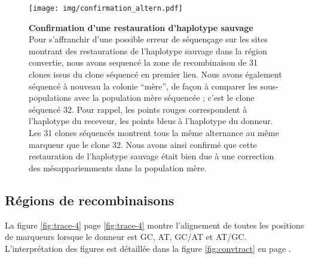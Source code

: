 \begin{figure}[h!]
  \centering
  \texttt{[image: img/confirmation\_altern.pdf]}
  \caption[Confirmation des restaurations]{\label{fig:confirm-haplotype}
    \textbf{Confirmation d'une restauration d'haplotype sauvage} \\
    \rmfamily Pour s'affranchir d'une possible erreur de séquençage sur les
    sites montrant des restaurations de l'haplotype sauvage dans la région
    convertie, nous avons sequencé la zone de recombinaison de 31 clones issus
    du clone séquencé en premier lieu. Nous avons également séquencé à nouveau
    la colonie ``mère'', de façon à comparer les sous-populations avec la
    population mère séquencée ; c'est le clone séquencé \num{32}. Pour rappel,
    les points rouges correspondent à l'haplotype du receveur, les points bleus
    à l'haplotype du donneur. Les 31 clones séquencés montrent tous la même
    alternance au même marqueur que le clone 32. Nous avons ainsi confirmé que
    cette restauration de l'haplotype sauvage était bien due à une correction
    des mésappariemments dans la population mère. }
\end{figure}

\subsection{Régions de recombinaisons}
\label{subsec:trac-de-conv}

La figure \ref{fig:trace-4} page \ref{fig:trace-4} montre l'alignement de toutes
les positions de marqueurs lorsque le donneur est GC, AT, GC/AT et AT/GC.
L'interprétation des figures est détaillée dans la figure \ref{fig:convtract} en
page \pageref{fig:convtract}.



